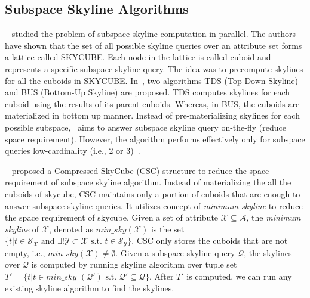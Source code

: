 \subsection{Subspace Skyline Algorithms}
~\cite{yuan2005efficient, pei2005catching} studied the problem of subspace skyline computation in parallel. The authors have shown that the set of all possible skyline queries over an attribute set forms a lattice called SKYCUBE. Each node in the lattice is called cuboid and represents a specific subspace skyline query. The idea was to precompute skylines for all the cuboids in SKYCUBE. In~\cite{yuan2005efficient}, two algorithms TDS (Top-Down Skyline) and BUS (Bottom-Up Skyline) are proposed. TDS computes skylines for each cuboid using the results of its parent cuboids. Whereas, in BUS, the cuboids are materialized in bottom up manner. Instead of pre-materializing skylines for each possible subspace,~\cite{tao2006subsky} aims to answer subspace skyline query on-the-fly (reduce space requirement). However, the algorithm performs effectively only for subspace queries low-cardinality (i.e., 2 or 3)~\cite{xia2006refreshing}.

~\cite{xia2012online} proposed a Compressed SkyCube (CSC) structure to reduce the space requirement of subspace skyline algorithm. Instead of materializing the all the cuboids of skycube, CSC maintains only a portion of cuboids that are enough to answer subspace skyline queries. It utilizes concept of \textit{minimum skyline} to reduce the space requirement of skycube. Given a set of attribute $\mathcal{X} \subseteq \mathcal{A}$, the \textit{minimum skyline} of $\mathcal{X}$, denoted as $min\_sky(\mathcal{X})$ is the set $\{t | t \in \mathcal{S}_\mathcal{X} \text{ and } \exists! \mathcal{Y} \subset \mathcal{X} \text{ s.t. } t \in \mathcal{S}_\mathcal{Y}  \}$. CSC only stores the cuboids that are not empty, i.e., $min\_sky(\mathcal{X}) \neq \emptyset$. Given a subspace skyline query $\mathcal{Q}$, the skylines over $\mathcal{Q}$ is computed by running skyline algorithm over tuple set $T' = \{ t | t \in  \textit{min\_sky }(\mathcal{Q'}) \text { s.t. } \mathcal{Q'} \subseteq \mathcal{Q} \}$. After $T'$ is computed, we can run any existing skyline algorithm to find the skylines. 

